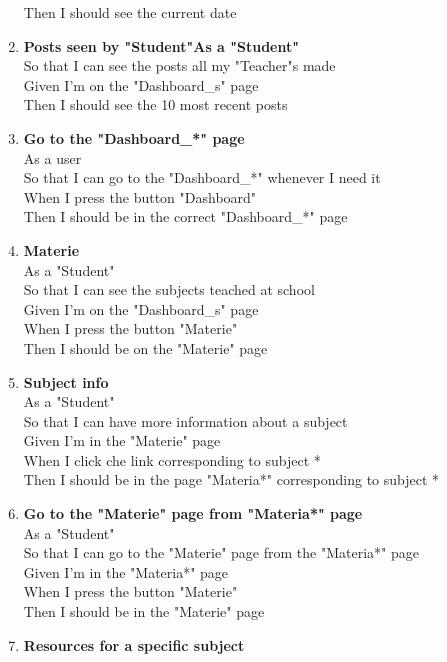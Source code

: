 \documentclass[Lau, binding=0.6cm]{sapthesis}
\begin{document}
\begin{enumerate}
			Then I should see the current date\\
	\item \textbf{Posts seen by "Student"As a "Student"}\\
			So that I can see the posts all my "Teacher"s made\\
			Given I’m on the "Dashboard\_s" page\\
			Then I should see the 10 most recent posts\\
	\item \textbf{Go to the "Dashboard\_*" page}\\
			As a user\\
			So that I can go to the "Dashboard\_*" whenever I need it\\
			When I press the button "Dashboard"\\
			Then I should be in the correct "Dashboard\_*" page\\
	\item \textbf{Materie}\\
			As a "Student"\\
			So that I can see the subjects teached at school\\
			Given I’m on the "Dashboard\_s" page\\
			When I press the button "Materie"\\
			Then I should be on the "Materie" page\\
	\item \textbf{Subject info}\\
			As a "Student"\\
			So that I can have more information about a subject\\
			Given I’m in the "Materie" page\\
			When I click che link corresponding to subject *\\
			Then I should be in the page "Materia*" corresponding to subject *\\
	\item \textbf{Go to the "Materie" page from "Materia*" page}\\
			As a "Student"\\
			So that I can go to the "Materie" page from the "Materia*" page\\
			Given I’m in the "Materia*" page\\
			When I press the button "Materie"\\
			Then I should be in the "Materie" page\\
	\item \textbf{Resources for a specific subject}\\

\end{enumerate}
\end{document}
